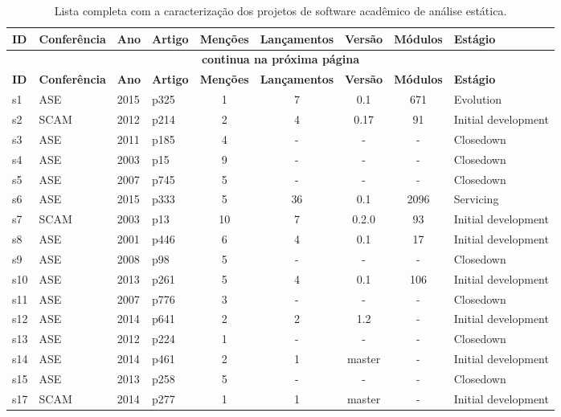 \begin{longtable}{| l | l | l | l | c | c | c | c | l |}
  \caption{Lista completa com a caracterização dos projetos de software acadêmico de análise estática.}
  \label{dataset-table} \\
  \hline
  \endfirsthead
  \hline
  \textbf{ID} & \textbf{Conferência} & \textbf{Ano} & \textbf{Artigo} & \textbf{Menções} & \textbf{Lançamentos} & \textbf{Versão} & \textbf{Módulos} & \textbf{Estágio} \\
  \hline
  \endhead
  \multicolumn{9}{c}{\textbf{continua na próxima página}} \\
  \hhline{---------} \endfoot
  \endlastfoot
  \textbf{ID} & \textbf{Conferência} & \textbf{Ano} & \textbf{Artigo} & \textbf{Menções} & \textbf{Lançamentos} & \textbf{Versão} & \textbf{Módulos} & \textbf{Estágio} \\
  \hline
s1 & ASE & 2015 & p325 & 1 & 7 & 0.1 & 671 & Evolution \\
    \hline
s2 & SCAM & 2012 & p214 & 2 & 4 & 0.17 & 91 & Initial development \\
    \hline
s3 & ASE & 2011 & p185 & 4 & - & - & - & Closedown \\
    \hline
s4 & ASE & 2003 & p15 & 9 & - & - & - & Closedown \\
    \hline
s5 & ASE & 2007 & p745 & 5 & - & - & - & Closedown \\
    \hline
s6 & ASE & 2015 & p333 & 5 & 36 & 0.1 & 2096 & Servicing \\
    \hline
s7 & SCAM & 2003 & p13 & 10 & 7 & 0.2.0 & 93 & Initial development \\
    \hline
s8 & ASE & 2001 & p446 & 6 & 4 & 0.1 & 17 & Initial development \\
    \hline
s9 & ASE & 2008 & p98 & 5 & - & - & - & Closedown \\
    \hline
s10 & ASE & 2013 & p261 & 5 & 4 & 0.1 & 106 & Initial development \\
    \hline
s11 & ASE & 2007 & p776 & 3 & - & - & - & Closedown \\
    \hline
s12 & ASE & 2014 & p641 & 2 & 2 & 1.2 & - & Initial development \\
    \hline
s13 & ASE & 2012 & p224 & 1 & - & - & - & Closedown \\
    \hline
s14 & ASE & 2014 & p461 & 2 & 1 & master & - & Initial development \\
    \hline
s15 & ASE & 2013 & p258 & 5 & - & - & - & Closedown \\
    \hline
s17 & SCAM & 2014 & p277 & 1 & 1 & master & - & Initial development \\

\end{longtable}
